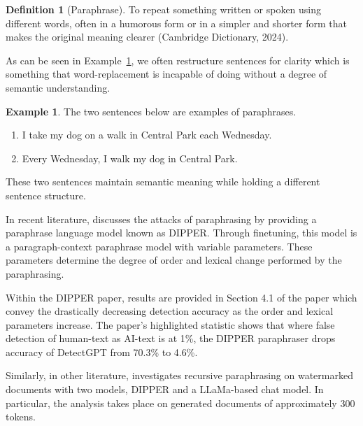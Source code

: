 \documentclass{l4proj}
\theoremstyle{definition}
\newtheorem{definition}{Definition}[section]
\newtheorem{example}{Example}[section]
\begin{document}
        \begin{definition}[Paraphrase]
            \label{def:paraphrase}
            To repeat something written or spoken using different words, often in a humorous form or in a simpler and shorter form that makes the original meaning clearer (Cambridge Dictionary, 2024). %
        \end{definition}

        As can be seen in Example~\ref{example:paraphrase}, we often restructure sentences for clarity which is something that word-replacement is incapable of doing without a degree of semantic understanding.

        \begin{example}
            \label{example:paraphrase}
            The two sentences below are examples of paraphrases.
            \begin{enumerate}[label=(\alph*)]
                \item I take my dog on a walk in Central Park each Wednesday. 
                \item Every Wednesday, I walk my dog in Central Park.
            \end{enumerate}
            These two sentences maintain semantic meaning while holding a different sentence structure. 
        \end{example}

        In recent literature, \citet{krishna2023paraphrasing} discusses the attacks of paraphrasing by providing a paraphrase language model known as DIPPER. Through finetuning, this model is a paragraph-context paraphrase model with variable parameters. These parameters determine the degree of order and lexical change performed by the paraphrasing. 

        Within the DIPPER paper, results are provided in Section 4.1 of the paper which convey the drastically decreasing detection accuracy as the order and lexical parameters increase.
        The paper's highlighted statistic shows that where false detection of human-text as AI-text is at 1\%, the DIPPER paraphraser drops accuracy of DetectGPT from 70.3\% to 4.6\%.

        Similarly, in other literature, \citet{sadasivan2023aigenerated} investigates recursive paraphrasing on watermarked documents with two models, DIPPER and a LLaMa-based chat model. In particular, the analysis takes place on generated documents of approximately 300 tokens. 
\end{document}
